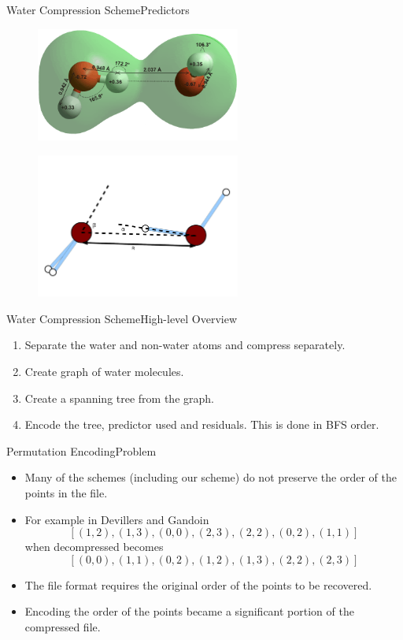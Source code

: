 \documentclass{beamer}
\begin{document}
\begin{frame}{Water Compression Scheme}{Predictors}
  \begin{figure}[h]
    \centering \includegraphics[width=0.6\textwidth]{keegan-images/h402}
  \end{figure}
  \begin{figure}[h]
    \centering \includegraphics[trim = 10mm 30mm 10mm 45mm, clip,
      width=0.6\textwidth]{keegan-images/dimer-angle}
  \end{figure}
\end{frame}

\begin{frame}{Water Compression Scheme}{High-level Overview}
  \begin{enumerate}
  \item Separate the water and non-water atoms and compress separately.
  \item Create graph of water molecules.
  \item Create a spanning tree from the graph.
  \item Encode the tree, predictor used and residuals. This is done in BFS
    order.
  \end{enumerate}
\end{frame}

\begin{frame}{Permutation Encoding}{Problem}
  \begin{itemize}
  \item Many of the schemes (including our scheme) do not preserve the order
    of the points in the file.
  \item For example in Devillers and Gandoin
    \[ [ (1, 2), (1, 3), (0, 0), (2, 3), (2, 2), (0, 2), (1, 1) ] \]
    when decompressed becomes
    \[ [ (0, 0), (1, 1), (0, 2), (1, 2), (1, 3), (2, 2), (2, 3) ] \]
  \item The file format requires the original order of the points to be
    recovered.
  \item Encoding the order of the points became a significant portion of the
    compressed file.
  \end{itemize}
\end{frame}
\end{document}
